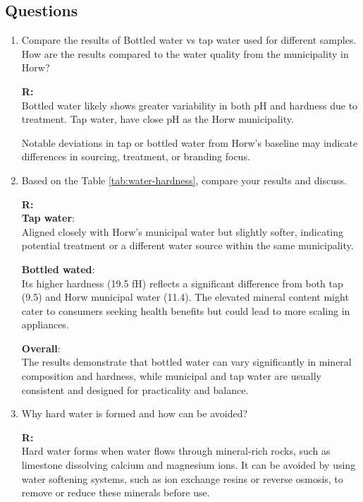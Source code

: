 \documentclass{article}
\begin{document}
\subsection{Questions}
\begin{enumerate}
    \item Compare the results of Bottled water vs tap water used for different
        samples. How are the results compared to the water quality from the
        municipality in Horw?

        \textbf{R:\\}
        Bottled water likely shows greater variability in both pH and hardness due to treatment. Tap water, have close pH as the Horw municipality.

        Notable deviations in tap or bottled water from Horw’s baseline may indicate differences in sourcing, treatment, or branding focus.

    \item Based on the Table \ref{tab:water-hardness}, compare your results and discuss.
    
        \textbf{R:\\}
        \textbf{Tap water}:\\
        Aligned closely with Horw’s municipal water but slightly softer, indicating
        potential treatment or a different water source within the same municipality.

        \textbf{Bottled wated}:\\
        Its higher hardness (19.5 fH) reflects a significant difference from both tap
        (9.5) and Horw municipal water (11.4). The elevated mineral content might cater to
        consumers seeking health benefits but could lead to more scaling in appliances.

        \textbf{Overall}:\\
        The results demonstrate that bottled water can vary significantly in mineral
        composition and hardness, while municipal and tap water are usually consistent
        and designed for practicality and balance.


    \item Why hard water is formed and how can be avoided?

        \textbf{R:\\}
        Hard water forms when water flows through mineral-rich rocks, such as limestone
        dissolving calcium and magnesium ions. It can be avoided by using water softening
        systems, such as ion exchange resins or reverse osmosis, to remove or reduce these
        minerals before use.


\end{enumerate}
\end{document}
